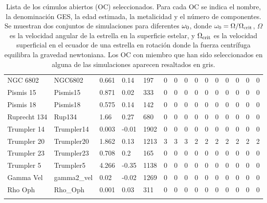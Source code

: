\begin{longtable}[c]{|l l l l l || c c c c c | c c c c c|}
		NGC 6802 & NGC6802 & 0.661 & 0.14 & 197 & 0 & 0 & 0 & 0 & 0 & 0 & 0 & 0 & 0 & 0\\
		Pismis 15 & Pismis15 & 0.871 & 0.02 & 333 & 0 & 0 & 0 & 0 & 0 & 0 & 0 & 0 & 0 & 0\\
		Pismis 18 & Pismis18 & 0.575 & 0.14 & 142 & 0 & 0 & 0 & 0 & 0 & 0 & 0 & 0 & 0 & 0\\
		Ruprecht 134 & Rup134 & 1.66 & 0.27 & 680 & 0 & 0 & 0 & 0 & 0 & 0 & 0 & 0 & 0 & 0\\
		Trumpler 14 & Trumpler14 & 0.003 & -0.01 & 1902 & 0 & 0 & 0 & 0 & 0 & 0 & 0 & 0 & 0 & 0\\
		\rowcolor{lightgray}
		Trumpler 20 & Trumpler20 & 1.862 & 0.13 & 1213 & 3 & 3 & 3 & 2 & 2 & 2 & 2 & 2 & 2 & 2\\
		Trumpler 23 & Trumpler23 & 0.708 & 0.2 & 165 & 0 & 0 & 0 & 0 & 0 & 0 & 0 & 0 & 0 & 0\\
		Trumpler 5 & Trumpler5 & 4.266 & -0.35 & 1138 & 0 & 0 & 0 & 0 & 0 & 0 & 0 & 0 & 0 & 0\\
		Gamma Vel & gamma2\_vel & 0.02 & -0.02 & 1269 & 0 & 0 & 0 & 0 & 0 & 0 & 0 & 0 & 0 & 0\\
		Rho Oph & Rho\_Oph & 0.001 & 0.03 & 311 & 0 & 0 & 0 & 0 & 0 & 0 & 0 & 0 & 0 & 0\\           
		\hline
	\caption{Lista de los cúmulos abiertos (OC) seleccionados. Para cada OC se indica el nombre, la denominación GES, la edad estimada, la metalicidad y el número de componentes. Se muestran dos conjuntos de simulaciones para diferentes $\omega_{\mathrm{0}}$, donde $\omega_{\mathrm{0}} = \Omega / \Omega_{\mathrm{crit}}$, $\Omega$ es la velocidad angular de la estrella en la superficie estelar, y $\Omega_{\mathrm{crit}}$ es la velocidad superficial en el ecuador de una estrella en rotación donde la fuerza centrífuga equilibra la gravedad newtoniana. Los OC con miembro que han sido seleccionados en alguna de las simulaciones aparecen resaltados en gris.}
	\label{tab:oc_full_list}
\end{longtable}
\newpage
{}
\recalctypearea

\endinput
